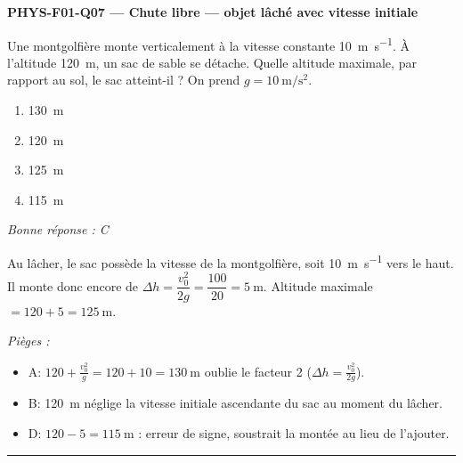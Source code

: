 \documentclass[11pt,a4paper]{article}
\begin{document}
\noindent\textbf{PHYS-F01-Q07 --- Chute libre --- objet lâché avec vitesse initiale}\par
Une montgolfière monte verticalement à la vitesse constante \qty{10}{\metre\per\second}. À l'altitude \qty{120}{\metre}, un sac de sable se détache. Quelle altitude maximale, par rapport au sol, le sac atteint-il ? On prend $g=\qty{10}{\metre\per\second\squared}$.
\begin{enumerate}[label=\Alph*)]
\item \qty{130}{\metre}
\item \qty{120}{\metre}
\item \qty{125}{\metre}
\item \qty{115}{\metre}
\end{enumerate}
\textit{Bonne réponse : C}\par
Au lâcher, le sac possède la vitesse de la montgolfière, soit \qty{10}{\metre\per\second} vers le haut. Il monte donc encore de $\Delta h=\dfrac{v_0^2}{2g}=\dfrac{100}{20}=\qty{5}{\metre}$. Altitude maximale $=120+5=\qty{125}{\metre}$.\par
\textit{Pièges :}
\begin{itemize}
\item A: $120+\frac{v_0^2}{g}=120+10=\qty{130}{\metre}$ oublie le facteur 2 ($\Delta h=\frac{v_0^2}{2g}$).
\item B: \qty{120}{\metre} néglige la vitesse initiale ascendante du sac au moment du lâcher.
\item D: $120-5=\qty{115}{\metre}$ : erreur de signe, soustrait la montée au lieu de l'ajouter.
\end{itemize}
\vspace{8pt}\hrule\vspace{8pt}
\end{document}
